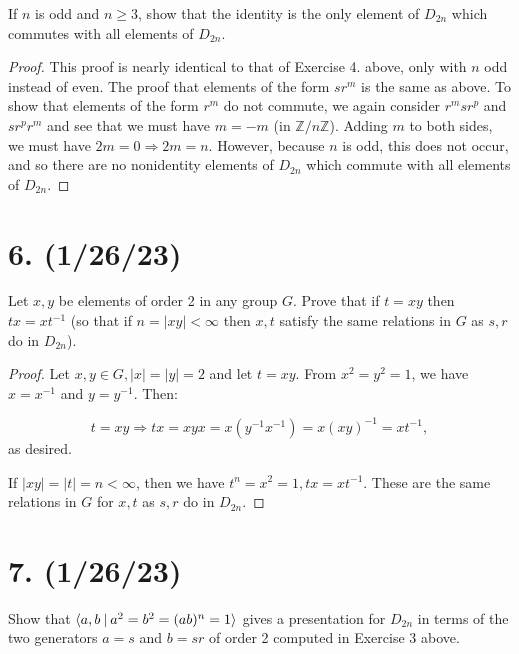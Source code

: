 \documentclass{article}
\begin{document}
If $n$ is odd and $n \geq 3$, show that the identity is the only element of $D_{2n}$ which commutes with all elements of $D_{2n}$.

\begin{proof}
    This proof is nearly identical to that of Exercise 4. above, only with $n$ odd instead of even. The proof that elements of the form $sr^m$ is the same as above. To show that elements of the form $r^m$ do not commute, we again consider $r^m sr^p$ and $sr^p r^m$ and see that we must have $m = -m$ (in $\mathbb{Z}/n\mathbb{Z}$). Adding $m$ to both sides, we must have $2m = 0 \Rightarrow 2m = n$. However, because $n$ is odd, this does not occur, and so there are no nonidentity elements of $D_{2n}$ which commute with all elements of $D_{2n}$.
\end{proof}

\section*{6. (1/26/23)}

Let $x, y$ be elements of order 2 in any group $G$. Prove that if $t = xy$ then $tx = xt^{-1}$ (so that if $n = |xy| < \infty$ then $x, t$ satisfy the same relations in $G$ as $s, r$ do in $D_{2n}$).

\begin{proof}
    Let $x, y \in G, |x| = |y| = 2$ and let $t = xy$. From $x^2 = y^2 = 1$, we have $x = x^{-1}$ and $y = y^{-1}$. Then:

    \begin{equation*}
        t = xy \Rightarrow tx = xyx = x(y^{-1} x^{-1}) = x(xy)^{-1} = xt^{-1},
    \end{equation*}
    as desired.

    If $|xy| = |t| = n < \infty$, then we have $t^n = x^2 = 1, tx = xt^{-1}$. These are the same relations in $G$ for $x, t$ as $s, r$ do in $D_{2n}$.
\end{proof}

\section*{7. (1/26/23)}

Show that $\langle a, b\hspace{0.5ex}|\hspace{0.5ex} a^2 = b^2 = (ab)^n = 1 \rangle$ gives a presentation for $D_{2n}$ in terms of the two generators $a = s$ and $b = sr$ of order 2 computed in Exercise 3 above.
\end{document}
